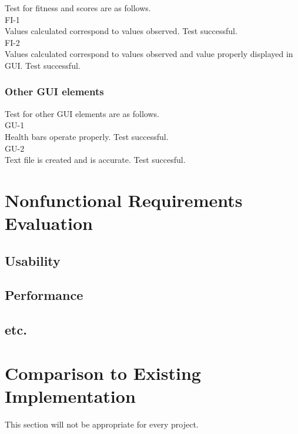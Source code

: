 \documentclass[12pt, titlepage]{article}
\begin{document}
Test for fitness and scores are as follows.\\

FI-1\\

Values calculated correspond to values observed. Test successful.\\

FI-2\\

Values calculated correspond to values observed and value properly displayed in GUI. Test successful.

\subsubsection{Other GUI elements}

Test for other GUI elements are as follows.\\

GU-1\\

Health bars operate properly. Test successful.\\

GU-2\\

Text file is created and is accurate. Test succesful.

\section{Nonfunctional Requirements Evaluation}

\subsection{Usability}
		
\subsection{Performance}

\subsection{etc.}
	
\section{Comparison to Existing Implementation}	

This section will not be appropriate for every project.
\end{document}
